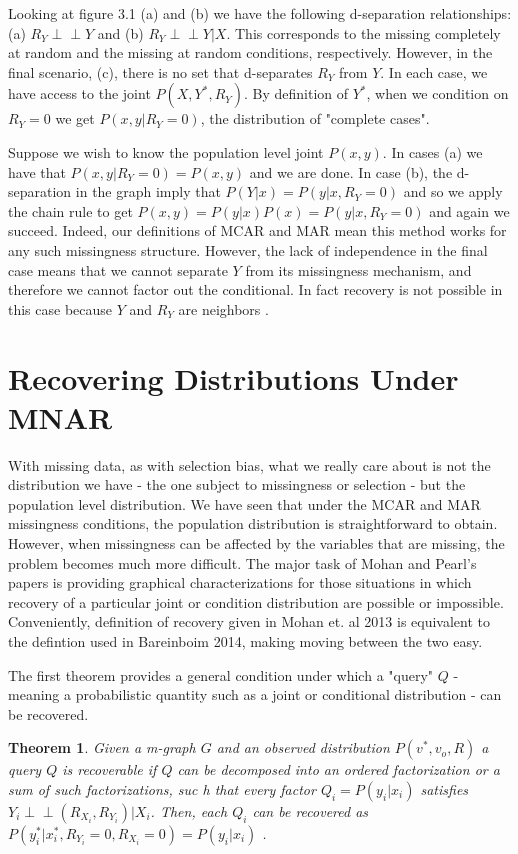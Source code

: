 \documentclass[12pt,twoside]{reedthesis}
\newtheorem{theorem}{Theorem}
\theoremstyle{definition}
\newcommand{\dsep}{\perp \!\!\!\perp}
\begin{document}
Looking at figure 3.1 (a) and (b) we have the following d-separation relationships: (a) $R_Y \dsep Y$ and (b) $R_Y \dsep Y | X$. This corresponds to the missing completely at random and the missing at random conditions, respectively. However, in the final scenario, (c), there is no set that d-separates $R_Y$ from $Y$. In each case, we have access to the joint $P(X,Y^*, R_Y)$.  By definition of $Y^*$, when we condition on $R_Y = 0$ we get $P(x,y | R_Y = 0)$, the distribution of "complete cases".

Suppose we wish to know the population level joint $P(x,y)$.  In cases (a) we have that $P(x,y | R_Y = 0) = P(x,y)$ and we are done. In case (b), the d-separation in the graph imply that $P(Y|x) = P(y| x, R_Y = 0)$ and so we apply the chain rule to get $P(x,y) = P(y|x)P(x) = P(y | x, R_Y = 0)$ and again we succeed. Indeed, our definitions of MCAR and MAR mean this method works for any such missingness structure. However, the lack of independence in the final case means that we cannot separate $Y$ from its missingness mechanism, and therefore we cannot factor out the conditional. In fact recovery is not possible in this case because $Y$ and $R_Y$ are neighbors \citep{Mohan_2013}. 

\section{Recovering Distributions Under MNAR}

With missing data, as with selection bias, what we really care about is not the distribution we have - the one subject to missingness or selection - but the population level distribution. We have seen that under the MCAR and MAR missingness conditions, the population distribution is straightforward to obtain. However, when missingness can be affected by the variables that are missing, the problem becomes much more difficult. The major task of Mohan and Pearl's papers is providing graphical characterizations for those situations in which recovery of a particular joint or condition distribution are possible or impossible. Conveniently,  definition of recovery given in Mohan et. al 2013 is equivalent to the defintion used in Bareinboim 2014,  making moving between the two easy. 

The first theorem provides a general condition under which a "query" $Q$ - meaning a probabilistic quantity such as a joint or conditional distribution - can be recovered. 

\begin{theorem}
Given a m-graph $G$ and an observed distribution $P(v^*, v_o, R)$ a query $Q$ is recoverable if $Q$ can be decomposed into an ordered factorization or a sum of such factorizations, suc h that every factor $Q_i = P(y_i | x_i)$ satisfies $Y_i \dsep (R_{X_i}, R_{Y_i}) | X_i$. Then, each $Q_i$ can be recovered as $P(y^*_i | x^*_i, R_{Y_i} = 0,R_{X_i} = 0) = P(y_i | x_i)$ \citep{Mohan_2013}. 
\end{theorem}
\end{document}
